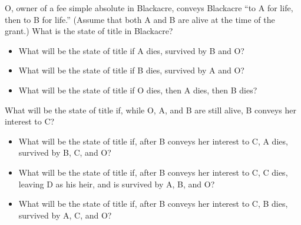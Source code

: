 \item O, owner of a fee simple absolute in Blackacre, conveys Blackacre ``to A
for life, then to B for life.'' (Assume that both A and B are alive at the time
of the grant.) What is the state of title in Blackacre?

\begin{itemize}
\item What will be the state of title if A dies, survived by B and O? 
\item What will be the state of title if B dies, survived by A and O? 
\item What will be the state of title if O dies, then A dies, then B dies?
\end{itemize}


\item What will be the state of title if, while O, A, and B are still alive, B
conveys her interest to C?

\begin{itemize}
\item What will be the state of title if, after B conveys her interest to C, A
dies, survived by B, C, and O?
\item What will be the state of title if, after B conveys her interest to C, C
dies, leaving D as his heir, and is survived by A, B, and O?
\item What will be the state of title if, after B conveys her interest to C, B
dies, survived by A, C, and O?
\end{itemize}

